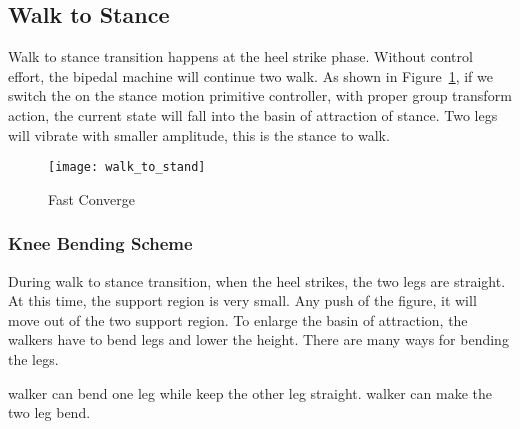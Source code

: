 \subsection{Walk to Stance}
Walk to stance transition happens at the heel strike phase.
Without control effort, the bipedal machine will continue two walk.
As shown in Figure~\ref{fig:walksstance},
if we switch the on the stance motion primitive controller, with proper group transform action, the current state will fall into the basin of attraction of stance.
Two legs will vibrate with smaller amplitude, this is the stance to walk.

\begin{figure}[!htbp]
  \begin{center}
    \texttt{[image: walk\_to\_stand]}
    \caption{Fast Converge}
    \label{fig:walksstance}
	\end{center}
\end{figure}







\subsubsection*{Knee Bending Scheme}
During walk to stance transition, when the heel strikes, the two legs are straight. 
At this time, the support region is very small.
Any push of the figure, it will move out of the two support region.
To enlarge the basin of attraction, the walkers have to bend legs and lower the height.
There are many ways for bending the legs.


\begin{itemize}
		walker can bend one leg while keep the other leg straight.
		walker can make the two leg bend.
\end{itemize}

